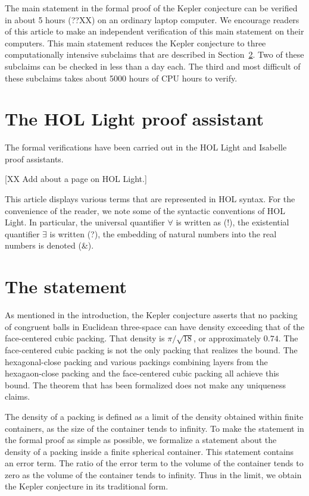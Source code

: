 The main statement in the formal proof of the Kepler conjecture can be
verified in about 5 hours (??XX) on an ordinary laptop computer.  We
encourage readers of this article to make an independent
verification of this main statement on their computers.  This main
statement reduces the Kepler conjecture to three computationally
intensive subclaims that are described in Section~\ref{sec:statement}.  Two of
these subclaims can be checked in less than a day each.  The third and
most difficult of these subclaims takes about 5000 hours of CPU hours
to verify.



\section{The HOL Light proof assistant}

The formal verifications have been carried out in the HOL Light and
Isabelle proof assistants.

[XX Add about a page on HOL Light.]

This article displays various terms that are represented in HOL syntax.  For
the convenience of the reader, we note some of the syntactic
conventions of HOL Light.  In particular, the universal quantifier
$\forall$ is written as (!), the existential quantifier $\exists$ is
written (?), the embedding of natural numbers into the real numbers is
denoted (\&).


\section{The statement}\label{sec:statement}

As mentioned in the introduction, the Kepler conjecture asserts that
no packing of congruent balls in Euclidean three-space can have
density exceeding that of the face-centered cubic packing.  That
density is $\pi/\sqrt{18}$, or approximately $0.74$.  The
face-centered cubic packing is not the only packing that realizes the
bound.  The hexagonal-close packing and various packings combining
layers from the hexagaon-close packing and the face-centered cubic
packing all achieve this bound.  The theorem that has been formalized
does not make any uniqueness claims.

The density of a packing is defined as a limit of the density obtained
within finite containers, as the size of the container tends to
infinity.  To make the statement in the formal proof as simple as
possible, we formalize a statement about the density of a packing
inside a finite spherical container.  This statement contains an error
term.  The ratio of the error term to the volume of the container
tends to zero as the volume of the container tends to infinity.  Thus
in the limit, we obtain the Kepler conjecture in its traditional form.

